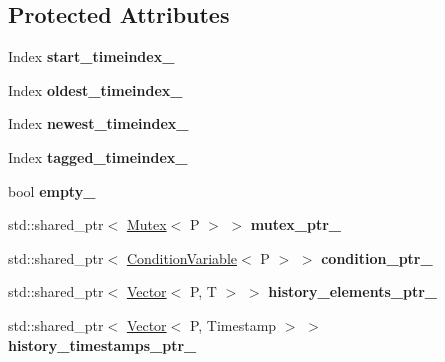 \subsection*{Protected Attributes}
\begin{DoxyCompactItemize}
\item 
\mbox{\label{classtime__series_1_1internal_1_1TimeSeriesBase_a6f78dd0d9435126ff803248499fad636}} 
Index {\bfseries start\+\_\+timeindex\+\_\+}
\item 
\mbox{\label{classtime__series_1_1internal_1_1TimeSeriesBase_aec2ed21821c0dc475c9360e9124aa550}} 
Index {\bfseries oldest\+\_\+timeindex\+\_\+}
\item 
\mbox{\label{classtime__series_1_1internal_1_1TimeSeriesBase_af82c823d37375e138e8c11c46a506cae}} 
Index {\bfseries newest\+\_\+timeindex\+\_\+}
\item 
\mbox{\label{classtime__series_1_1internal_1_1TimeSeriesBase_a68c415d1fa3de6d751d3178d0c10006a}} 
Index {\bfseries tagged\+\_\+timeindex\+\_\+}
\item 
\mbox{\label{classtime__series_1_1internal_1_1TimeSeriesBase_a75518454f408a3dcc2a9a758fbf01fa6}} 
bool {\bfseries empty\+\_\+}
\item 
\mbox{\label{classtime__series_1_1internal_1_1TimeSeriesBase_ac192edc73cd3244e0a5ceb7ba1ff3bb6}} 
std\+::shared\+\_\+ptr$<$ \hyperlink{classtime__series_1_1internal_1_1Mutex}{Mutex}$<$ P $>$ $>$ {\bfseries mutex\+\_\+ptr\+\_\+}
\item 
\mbox{\label{classtime__series_1_1internal_1_1TimeSeriesBase_a728279a5c045f0784c176282cc5ae1fe}} 
std\+::shared\+\_\+ptr$<$ \hyperlink{classtime__series_1_1internal_1_1ConditionVariable}{Condition\+Variable}$<$ P $>$ $>$ {\bfseries condition\+\_\+ptr\+\_\+}
\item 
\mbox{\label{classtime__series_1_1internal_1_1TimeSeriesBase_aec36178b209eb829fa44f8c0292e1065}} 
std\+::shared\+\_\+ptr$<$ \hyperlink{classtime__series_1_1internal_1_1Vector}{Vector}$<$ P, T $>$ $>$ {\bfseries history\+\_\+elements\+\_\+ptr\+\_\+}
\item 
\mbox{\label{classtime__series_1_1internal_1_1TimeSeriesBase_aa9e47bae6a7e2270a1984bee683d1525}} 
std\+::shared\+\_\+ptr$<$ \hyperlink{classtime__series_1_1internal_1_1Vector}{Vector}$<$ P, Timestamp $>$ $>$ {\bfseries history\+\_\+timestamps\+\_\+ptr\+\_\+}
\end{DoxyCompactItemize}
